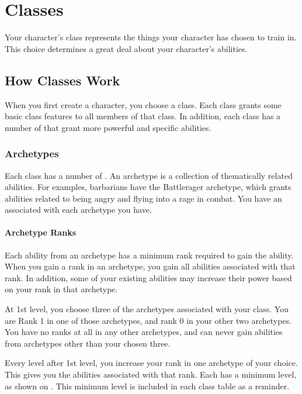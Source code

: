 \chapter{Classes}\label{Classes}

Your character's class represents the things your character has chosen to train in.
This choice determines a great deal about your character's abilities.

\section{How Classes Work}
    When you first create a character, you choose a class.
    Each class grants some basic class features to all members of that class.
    In addition, each class has a number of  that grant more powerful and specific abilities.

    \subsection{Archetypes}\label{Archetypes}
        Each class has a number of .
        An archetype is a collection of thematically related abilities.
        For examples, barbarians have the Battlerager archetype, which grants abilities related to being angry and flying into a rage in combat.
        You have an  associated with each archetype you have.

        \subsubsection{Archetype Ranks}\label{Archetype Ranks}
            Each ability from an archetype has a minimum rank required to gain the ability.
            When you gain a rank in an archetype, you gain all abilities associated with that rank.
            In addition, some of your existing abilities may increase their power based on your rank in that archetype.

            At 1st level, you choose three of the archetypes associated with your class.
            You are Rank 1 in one of those archetypes, and rank 0 in your other two archetypes.
            You have no ranks at all in any other archetypes, and can never gain abilities from archetypes other than your chosen three.

            Every level after 1st level, you increase your rank in one archetype of your choice.
            This gives you the abilities associated with that rank.
            Each  has a minimum level, as shown on .
            This minimum level is included in each class table as a reminder.

